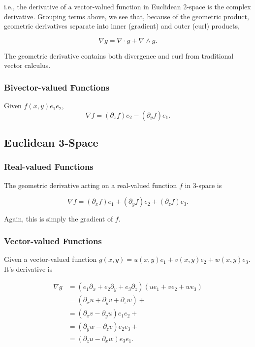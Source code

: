 	i.e., the derivative of a vector-valued function in Euclidean 2-space is the complex derivative. Grouping terms above, we see that, because of the geometric product, geometric derivatives separate into inner (gradient) and outer (curl) products,
	
	\[
	\nabla g = \nabla \cdot g + \nabla \wedge g.
	\]
	
	The geometric derivative contains both divergence and curl from traditional vector calculus.
	
	\subsubsection{Bivector-valued Functions}
	
	Given $f(x,y)e_1e_2$,
	\[
	\nabla f = \left(\partial_x f\right) e_2 - \left(\partial_y f\right) e_1.
	\]
	
	\subsection{Euclidean 3-Space}
	
	\subsubsection{Real-valued Functions}
	
	The geometric derivative acting on a real-valued function $f$ in 3-space is
	
	\[
	\nabla f = \left( \partial_x f\right) e_1  + \left( \partial_y f\right) e_2 + \left( \partial_z f\right) e_3.
	\]
	
	Again, this is simply the gradient of $f$.
	
	\subsubsection{Vector-valued Functions}
	
	Given a vector-valued function $g\left( x, y\right) = u \left( x, y\right)e_1 + v\left( x, y\right)e_2 + w\left( x, y\right)e_3.$ It's derivative is
	
	\begin{align*}
	\nabla g & = \left(e_1\partial_x + e_2\partial_y + e_3\partial_z\right) \left(ue_1 + ve_2 + we_3\right) \\
	& = \left( \partial_x u + \partial_y v + \partial_z w\right) + \\
	& = \left( \partial_x v - \partial_y u\right)e_1e_2 + \\
	& = \left( \partial_y w - \partial_z v\right)e_2e_3 + \\
	& = \left( \partial_z u - \partial_x w\right)e_3e_1.
	\end{align*}
	
